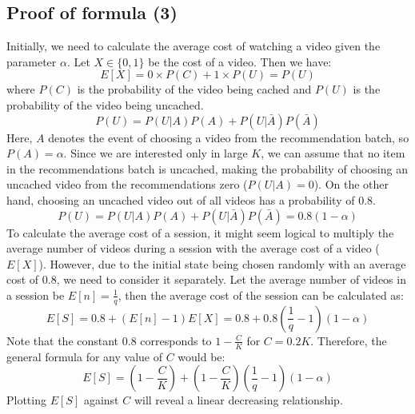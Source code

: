 \documentclass[12pt]{article}
\begin{document}
\subsection*{Proof of formula (3)}
Initially, we need to calculate the average cost of watching a video given the parameter $\alpha$. Let $X \in \{0, 1\}$ be the cost of a video. Then we have:
\begin{equation}
E[X] = 0 \times P(C) + 1 \times P(U) = P(U)
\end{equation}
where $P(C)$ is the probability of the video being cached and $P(U)$ is the probability of the video being uncached.
\begin{equation}
P(U) = P(U|A)P(A) + P(U|\bar{A})P(\bar{A})
\end{equation}
Here, $A$ denotes the event of choosing a video from the recommendation batch, so $P(A) = \alpha$. Since we are interested only in large $K$, we can assume that no item in the recommendations batch is uncached, making the probability of choosing an uncached video from the recommendations zero ($P(U|A) = 0$). On the other hand, choosing an uncached video out of all videos has a probability of $0.8$.
\begin{equation}
P(U) = P(U|A)P(A) + P(U|\bar{A})P(\bar{A}) = 0.8(1 - \alpha)
\end{equation}
To calculate the average cost of a session, it might seem logical to multiply the average number of videos during a session with the average cost of a video ($E[X]$). However, due to the initial state being chosen randomly with an average cost of $0.8$, we need to consider it separately. Let the average number of videos in a session be $E[n] = \frac{1}{q}$, then the average cost of the session can be calculated as:
\begin{equation}
E[S] = 0.8 + (E[n] - 1)E[X] = 0.8 + 0.8(\frac{1}{q}-1)(1 - \alpha)
\end{equation}
Note that the constant $0.8$ corresponds to $1 - \frac{C}{K}$ for $C = 0.2K$. Therefore, the general formula for any value of $C$ would be:
\begin{equation}
E[S] = \left(1 - \frac{C}{K}\right) + \left(1 - \frac{C}{K}\right)\left(\frac{1}{q}-1\right)\left(1 - \alpha\right)
\end{equation}
Plotting $E[S]$ against $C$ will reveal a linear decreasing relationship.
\end{document}
